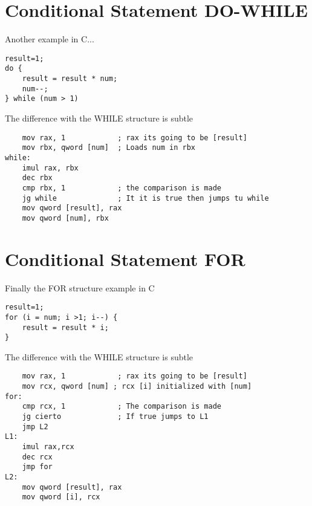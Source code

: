 \section{Conditional Statement DO-WHILE}
Another example in C...
\begin{verbatim}
result=1;
do {
	result = result * num;
	num--;
} while (num > 1)
\end{verbatim}
The difference with the WHILE structure is subtle
\begin{verbatim}
	mov rax, 1            ; rax its going to be [result]
	mov rbx, qword [num]  ; Loads num in rbx
while:
	imul rax, rbx
	dec rbx
	cmp rbx, 1            ; the comparison is made
	jg while              ; It it is true then jumps tu while
	mov qword [result], rax
	mov qword [num], rbx
\end{verbatim}

\section{Conditional Statement FOR}
Finally the FOR structure example in C
\begin{verbatim}
result=1;
for (i = num; i >1; i--) {
	result = result * i;
}
\end{verbatim}
The difference with the WHILE structure is subtle
\begin{verbatim}
	mov rax, 1            ; rax its going to be [result]
	mov rcx, qword [num] ; rcx [i] initialized with [num]
for:
	cmp rcx, 1            ; The comparison is made
	jg cierto             ; If true jumps to L1
	jmp L2
L1:
	imul rax,rcx
	dec rcx
	jmp for
L2:
	mov qword [result], rax
	mov qword [i], rcx
\end{verbatim}




